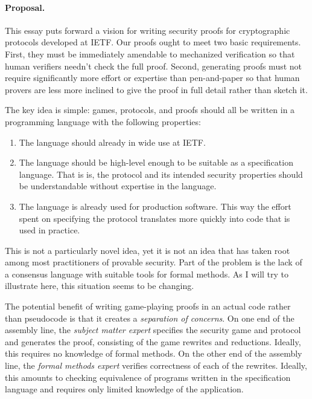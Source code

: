 \documentclass{article}
\begin{document}
%

\paragraph{Proposal.}
%
This essay puts forward a vision for writing security proofs for cryptographic
protocols developed at IETF.
%
Our proofs ought to meet two basic requirements.
%
First, they must be immediately amendable to mechanized verification so that
human verifiers needn't check the full proof.
%
Second, generating proofs must not require significantly more effort or
expertise than pen-and-paper so that human provers are less more inclined to
give the proof in full detail rather than sketch it.

The key idea is simple: games, protocols, and proofs should all be written in a
programming language with the following properties:
%
\begin{enumerate}

  \item The language should already in wide use at IETF.

  \item The language should be high-level enough to be suitable as a
    specification language. That is is, the protocol and its intended security
    properties should be understandable without expertise in the language.

  \item The language is already used for production software. This way the
    effort spent on specifying the protocol translates more quickly into code
    that is used in practice.

\end{enumerate}
%
This is not a particularly novel idea, yet it is not an idea that has taken
root among most practitioners of provable security.
%
Part of the problem is the lack of a consensus language with suitable tools for
formal methods. As I will try to illustrate here, this situation seems to be
changing.

The potential benefit of writing game-playing proofs in an actual code rather
than pseudocode is that it creates a \emph{separation of concerns}.
%
On one end of the assembly line, the \emph{subject matter expert} specifies the
security game and protocol and generates the proof, consisting of the game
rewrites and reductions. Ideally, this requires no knowledge of formal methods.
%
On the other end of the assembly line, the \emph{formal methods expert}
verifies correctness of each of the rewrites. Ideally, this amounts to checking
equivalence of programs written in the specification language and requires only
limited knowledge of the application.
\end{document}
